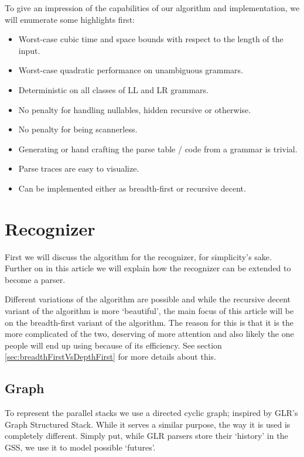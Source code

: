 \documentclass[a4paper,10pt]{article}
\begin{document}
To give an impression of the capabilities of our algorithm and implementation, we will enumerate some highlights first:
\begin{itemize}
 \setlength{\itemsep}{0pt}
 \setlength{\parskip}{0pt}
 \setlength{\parsep}{0pt}
 
 \item Worst-case cubic time and space bounds with respect to the length of the input.
 \item Worst-case quadratic performance on unambiguous grammars.
 \item Deterministic on all classes of LL and LR grammars.
 \item No penalty for handling nullables, hidden recursive or otherwise.
 \item No penalty for being scannerless.
 \item Generating or hand crafting the parse table / code from a grammar is trivial.
 \item Parse traces are easy to visualize.
 \item Can be implemented either as breadth-first or recursive decent.
\end{itemize}

\section{Recognizer}

First we will discuss the algorithm for the recognizer, for simplicity's sake. Further on in this article we will explain how the recognizer can be extended to become a parser.

Different variations of the algorithm are possible and while the recursive decent variant of the algorithm is more `beautiful', the main focus of this article will be on the breadth-first variant of the algorithm. The reason for this is that it is the more complicated of the two, deserving of more attention and also likely the one people will end up using because of its efficiency. See section \ref{sec:breadthFirstVsDepthFirst} for more details about this.

\subsection{Graph}

To represent the parallel stacks we use a directed cyclic graph; inspired by GLR's Graph Structured Stack. While it serves a similar purpose, the way it is used is completely different. Simply put, while GLR parsers store their `history' in the GSS, we use it to model possible `futures'.
\end{document}
